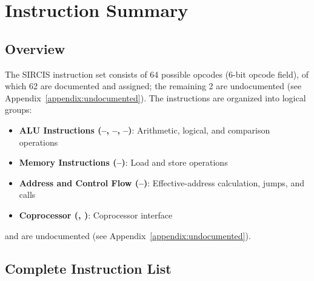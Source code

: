\chapter{Instruction Summary}
\label{ch:instruction-summary}

\section{Overview}

The SIRCIS instruction set consists of 64 possible opcodes (6-bit opcode field), of which 62 are documented and
assigned; the remaining 2 are undocumented (see Appendix~\ref{appendix:undocumented}). The instructions are organized
into logical groups:

\begin{itemize}
	\item \textbf{ALU Instructions (--, --, --)}: Arithmetic, logical, and comparison operations
	\item \textbf{Memory Instructions (--)}: Load and store operations
	\item \textbf{Address and Control Flow (--)}: Effective-address calculation, jumps, and calls
	\item \textbf{Coprocessor (, )}: Coprocessor interface
\end{itemize}

 and  are undocumented (see Appendix~\ref{appendix:undocumented}).

\section{Complete Instruction List}

